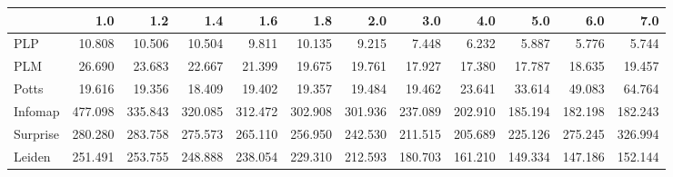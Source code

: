 \begin{tabular}{lrrrrrrrrrrr}
\toprule
{} &     1.0 &     1.2 &     1.4 &     1.6 &     1.8 &     2.0 &     3.0 &     4.0 &     5.0 &     6.0 &     7.0 \\
\midrule
PLP      &  10.808 &  10.506 &  10.504 &   9.811 &  10.135 &   9.215 &   7.448 &   6.232 &   5.887 &   5.776 &   5.744 \\
PLM      &  26.690 &  23.683 &  22.667 &  21.399 &  19.675 &  19.761 &  17.927 &  17.380 &  17.787 &  18.635 &  19.457 \\
Potts    &  19.616 &  19.356 &  18.409 &  19.402 &  19.357 &  19.484 &  19.462 &  23.641 &  33.614 &  49.083 &  64.764 \\
Infomap  & 477.098 & 335.843 & 320.085 & 312.472 & 302.908 & 301.936 & 237.089 & 202.910 & 185.194 & 182.198 & 182.243 \\
Surprise & 280.280 & 283.758 & 275.573 & 265.110 & 256.950 & 242.530 & 211.515 & 205.689 & 225.126 & 275.245 & 326.994 \\
Leiden   & 251.491 & 253.755 & 248.888 & 238.054 & 229.310 & 212.593 & 180.703 & 161.210 & 149.334 & 147.186 & 152.144 \\
\bottomrule
\end{tabular}
